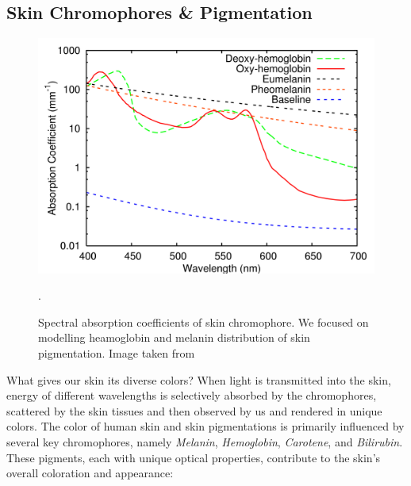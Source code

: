 \begin{spacing}{1.5}
\section{Skin Chromophores \& Pigmentation}
\begin{figure}
    \centering
    \includegraphics[width=0.9\columnwidth]{Chapter2/HM_abs.png}
    \caption{Spectral absorption coefficients of skin chromophore. We focused on modelling heamoglobin and melanin distribution of skin pigmentation. Image taken from\cite{10.5555/2383894.2383946}}.
    \label{fig:hm_abs}
\end{figure}

What gives our skin its diverse colors? When light is transmitted into the skin, energy of different wavelengths is selectively absorbed by the chromophores, scattered by the skin tissues and then observed by us and rendered in unique colors. The color of human skin and skin pigmentations is primarily influenced by several key chromophores, namely \textit{Melanin}, \textit{Hemoglobin}, \textit{Carotene}, and \textit{Bilirubin}. These pigments, each with unique optical properties, contribute to the skin's overall coloration and appearance:


\end{spacing}
